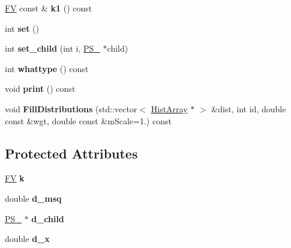 \begin{DoxyCompactItemize}
\item 
\hypertarget{classPS__2__1_a8896fae62d323bceb002628a95466f3f}{\hyperlink{classFV}{F\-V} const \& {\bfseries k1} () const }\label{classPS__2__1_a8896fae62d323bceb002628a95466f3f}

\item 
\hypertarget{classPS__2__1_a02e613ae4acac6c2ea9c57a49a8e3f68}{int {\bfseries set} ()}\label{classPS__2__1_a02e613ae4acac6c2ea9c57a49a8e3f68}

\item 
\hypertarget{classPS__2__1_a3bcae5991298ad9a2fc143d4461c60fa}{int {\bfseries set\-\_\-child} (int i, \hyperlink{classPS__2}{P\-S\-\_} $\ast$child)}\label{classPS__2__1_a3bcae5991298ad9a2fc143d4461c60fa}

\item 
\hypertarget{classPS__2__1_aaa0d8ed0b5e2673cb5f2cd84f090e1f9}{int {\bfseries whattype} () const }\label{classPS__2__1_aaa0d8ed0b5e2673cb5f2cd84f090e1f9}

\item 
\hypertarget{classPS__2__1_a21760964ae4b35c2cfeff16b4c569c3a}{void {\bfseries print} () const }\label{classPS__2__1_a21760964ae4b35c2cfeff16b4c569c3a}

\item 
\hypertarget{classPS__2__1_af20aba9c6be7e4c293f1919c702a53e7}{void {\bfseries Fill\-Distributions} (std\-::vector$<$ \hyperlink{classHistArray}{Hist\-Array} $\ast$ $>$ \&dist, int id, double const \&wgt, double const \&m\-Scale=1.) const }\label{classPS__2__1_af20aba9c6be7e4c293f1919c702a53e7}

\end{DoxyCompactItemize}
\subsection*{Protected Attributes}
\begin{DoxyCompactItemize}
\item 
\hypertarget{classPS__2__1_a3606766aee8e4775462c15adda3acbc5}{\hyperlink{classFV}{F\-V} {\bfseries k}}\label{classPS__2__1_a3606766aee8e4775462c15adda3acbc5}

\item 
\hypertarget{classPS__2__1_a415b225aedab250a67aee39ef0d859bc}{double {\bfseries d\-\_\-msq}}\label{classPS__2__1_a415b225aedab250a67aee39ef0d859bc}

\item 
\hypertarget{classPS__2__1_a015027e1fc8e30949ea8a439cfedddd4}{\hyperlink{classPS__2}{P\-S\-\_} $\ast$ {\bfseries d\-\_\-child}}\label{classPS__2__1_a015027e1fc8e30949ea8a439cfedddd4}

\item 
\hypertarget{classPS__2__1_af18aa8f6679b7ac65be236b00e794e0c}{double {\bfseries d\-\_\-x}}\label{classPS__2__1_af18aa8f6679b7ac65be236b00e794e0c}

\end{DoxyCompactItemize}
